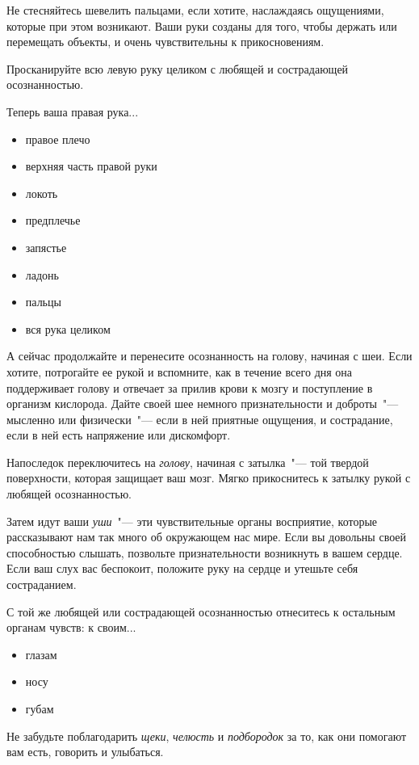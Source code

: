 \begin{itemize}
	\itemdiamondsuit Не стесняйтесь шевелить пальцами, если хотите, наслаждаясь ощущениями, которые при этом возникают. Ваши руки созданы для того, чтобы держать или перемещать объекты, и очень чувствительны к прикосновениям.
	
	\itemdiamondsuit Просканируйте всю левую руку целиком с любящей и сострадающей осознанностью.
	
	\itemdiamondsuit Теперь ваша правая рука...
	\begin{itemize}
		\item правое плечо
		\item верхняя часть правой руки
		\item локоть
		\item предплечье
		\item запястье
		\item ладонь
		\item пальцы
		\item вся рука целиком	
	\end{itemize}
	
	\itemdiamondsuit А сейчас продолжайте и перенесите осознанность на голову, начиная с шеи. Если хотите, потрогайте ее рукой и вспомните, как в течение всего дня она поддерживает голову и отвечает за прилив крови к мозгу и поступление в организм кислорода. Дайте своей шее немного признательности и доброты~"--- мысленно или  физически~"--- если в ней приятные ощущения, и сострадание, если в ней есть напряжение или дискомфорт.
	
	\itemdiamondsuit Напоследок переключитесь на \emph{голову}, начиная с затылка~"--- той твердой поверхности, которая защищает ваш мозг. Мягко прикоснитесь к затылку рукой с любящей осознанностью.
	
	\itemdiamondsuit Затем идут ваши \emph{уши}~"--- эти чувствительные органы восприятие, которые рассказывают нам так много об окружающем нас мире. Если вы довольны своей способностью слышать, позвольте признательности возникнуть в вашем сердце. Если ваш слух вас беспокоит, положите руку на сердце и утешьте себя состраданием.
	
	\itemdiamondsuit С той же любящей или сострадающей осознанностью отнеситесь к остальным органам чувств: к своим...
	\begin{itemize}
		\item глазам
		\item носу
		\item губам 	
	\end{itemize}
	
	\itemdiamondsuit Не забудьте поблагодарить \emph{щеки}, \emph{челюсть} и \emph{подбородок} за то, как они помогают вам есть, говорить и улыбаться.
	

\end{itemize}

